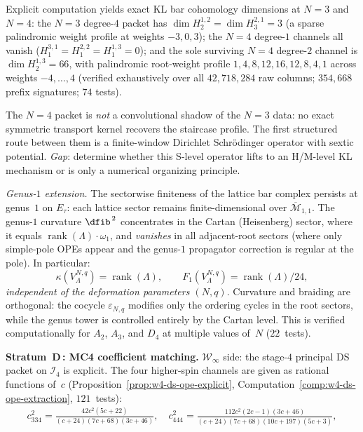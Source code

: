 \begin{remark}
Explicit computation yields exact KL bar cohomology dimensions at $N=3$ and $N=4$:
the $N=3$ degree-$4$ packet has $\dim H^{1,2}_2 = \dim H^{2,1}_3 = 3$ (a sparse palindromic weight profile at weights $-3,0,3$);
the $N=4$ degree-$1$ channels all vanish ($H^{3,1}_1 = H^{2,2}_1 = H^{1,3}_1 = 0$);
and the sole surviving $N=4$ degree-$2$ channel is $\dim H^{1,3}_2 = 66$,
with palindromic root-weight profile $1,4,8,12,16,12,8,4,1$ across weights $-4,\dots,4$
(verified exhaustively over all $42{,}718{,}284$ raw columns; $354{,}668$ prefix signatures; $74$ tests).

The $N=4$ packet is \emph{not} a convolutional shadow of the $N=3$ data:
no exact symmetric transport kernel recovers the staircase profile.
The first structured route between them is a finite-window Dirichlet Schr\"odinger operator with sextic potential.
\emph{Gap}: determine whether this S-level operator lifts to an H/M-level KL mechanism
or is only a numerical organizing principle.

\emph{Genus-$1$ extension.}
The sectorwise finiteness of the lattice bar complex persists at
genus~$1$ on $E_\tau$: each lattice sector remains finite-dimensional
over $\overline{\mathcal{M}}_{1,1}$. The genus-$1$ curvature
$\dfib^{\,2}$ concentrates in the Cartan (Heisenberg) sector, where
it equals $\operatorname{rank}(\Lambda) \cdot \omega_1$, and
\emph{vanishes} in all adjacent-root sectors (where only simple-pole
OPEs appear and the genus-$1$ propagator correction is regular at
the pole). In particular:
\[
\kappa(V_\Lambda^{N,q}) = \operatorname{rank}(\Lambda),
\qquad F_1(V_\Lambda^{N,q}) = \operatorname{rank}(\Lambda)/24,
\]
\emph{independent of the deformation parameters $(N,q)$}. Curvature
and braiding are orthogonal: the cocycle $\varepsilon_{N,q}$ modifies
only the ordering cycles in the root sectors, while the genus tower
is controlled entirely by the Cartan level. This is verified
computationally for $A_2$, $A_3$, and $D_4$ at multiple values
of~$N$ ($22$~tests).

\smallskip\noindent
\textbf{Stratum~D\,: MC4 coefficient matching.}
$\mathcal{W}_\infty$ side: the stage-$4$ principal DS packet on
$\mathcal{I}_4$ is explicit. The four higher-spin channels are given
as rational functions of~$c$
(Proposition~\ref{prop:w4-ds-ope-explicit},
Computation~\ref{comp:w4-ds-ope-extraction}, $121$~tests):
\begin{gather*}
c_{334}^2 = \frac{42c^2(5c+22)}{(c+24)(7c+68)(3c+46)},
\quad
c_{444}^2 = \frac{112c^2(2c-1)(3c+46)}{(c+24)(7c+68)(10c+197)(5c+3)},
\end{gather*}


\end{remark}
